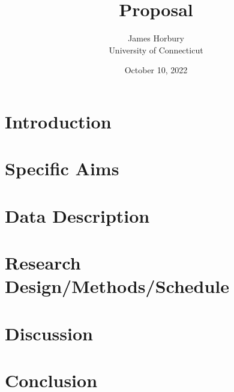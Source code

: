 \documentclass[12pt]{article}
\title{Proposal}
\author{James Horbury\\
    University of Connecticut
}
\date{October 10, 2022}
\begin{document}
\maketitle

\section*{Introduction}
\label{sec:intro}

\section*{Specific Aims}
\label{sec:spec}

\section*{Data Description}
\label{sec:data}

\section*{Research Design/Methods/Schedule}
\label{sec:res}

\section*{Discussion}
\label{sec:disc}

\section*{Conclusion}
\label{sec:conc}



\end{document}
